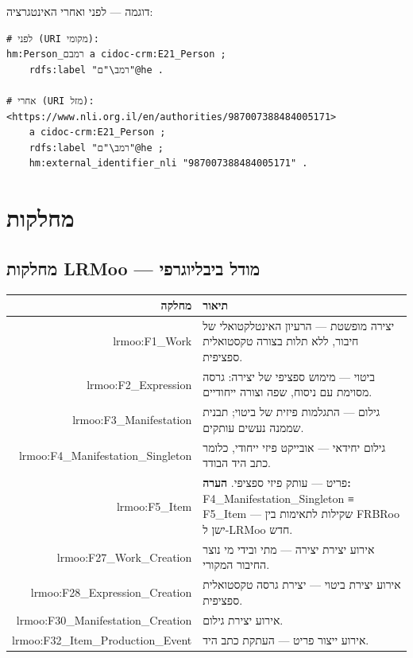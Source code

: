 \documentclass[12pt,a4paper]{article}
\newcommand{\en}[1]{\textenglish{\LR{#1}}}
\newcommand{\new}[1]{\textcolor{newaddition}{#1}}
\begin{document}
\new{דוגמה — לפני ואחרי האינטגרציה:}

\begin{verbatim}
# לפני (URI מקומי):
hm:Person_רמבם a cidoc-crm:E21_Person ;
    rdfs:label "רמב\"ם"@he .

# אחרי (URI מזל):
<https://www.nli.org.il/en/authorities/987007388484005171>
    a cidoc-crm:E21_Person ;
    rdfs:label "רמב\"ם"@he ;
    hm:external_identifier_nli "987007388484005171" .
\end{verbatim}

\newpage

\section{מחלקות \en{(Classes)}}

\subsection{מחלקות LRMoo — מודל ביבליוגרפי}

\begin{longtable}{|r|p{10cm}|}
\hline
\textbf{מחלקה} & \textbf{תיאור} \\
\hline
\endhead

lrmoo:F1\_Work & 
יצירה מופשטת — הרעיון האינטלקטואלי של חיבור, ללא תלות בצורה טקסטואלית ספציפית.\\
\hline

lrmoo:F2\_Expression & 
ביטוי — מימוש ספציפי של יצירה: גרסה מסוימת עם ניסוח, שפה וצורה ייחודיים.\\
\hline

lrmoo:F3\_Manifestation & 
גילום — התגלמות פיזית של ביטוי; תבנית שממנה נעשים עותקים.\\
\hline

lrmoo:F4\_Manifestation\_Singleton & 
גילום יחידאי — אובייקט פיזי ייחודי, כלומר כתב היד הבודד.\\
\hline

lrmoo:F5\_Item & 
פריט — עותק פיזי ספציפי. \textbf{הערה:} \textenglish{F4\_Manifestation\_Singleton ≡ F5\_Item} — שקילות לתאימות בין \textenglish{FRBRoo} ישן ל-\textenglish{LRMoo} חדש.\\
\hline

lrmoo:F27\_Work\_Creation & 
אירוע יצירת יצירה — מתי ובידי מי נוצר החיבור המקורי.\\
\hline

lrmoo:F28\_Expression\_Creation & 
אירוע יצירת ביטוי — יצירת גרסה טקסטואלית ספציפית.\\
\hline

lrmoo:F30\_Manifestation\_Creation & 
אירוע יצירת גילום.\\
\hline

lrmoo:F32\_Item\_Production\_Event & 
אירוע ייצור פריט — העתקת כתב היד.\\
\hline
\end{longtable}
\end{document}
